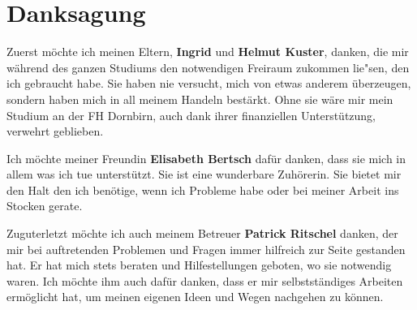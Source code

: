 \chapter*{Danksagung}

Zuerst m\"ochte ich meinen Eltern, {\bf Ingrid} und {\bf Helmut Kuster}, danken, die mir w\"ahrend des ganzen Studiums den notwendigen Freiraum zukommen lie"sen, den ich gebraucht habe. Sie haben nie versucht, mich von etwas anderem \"uberzeugen, sondern haben mich in all meinem Handeln best\"arkt. Ohne sie w\"are mir mein Studium an der FH Dornbirn, auch dank ihrer finanziellen Unterst\"utzung, verwehrt geblieben.

Ich m\"ochte meiner Freundin {\bf Elisabeth Bertsch} daf\"ur danken, dass sie mich in allem was ich tue unterst\"utzt. Sie ist eine wunderbare Zuh\"orerin. Sie bietet mir den Halt den ich ben\"otige, wenn ich Probleme habe oder bei meiner Arbeit ins Stocken gerate.

Zuguterletzt m\"ochte ich auch meinem Betreuer {\bf Patrick Ritschel} danken, der mir bei auftretenden Problemen und Fragen immer hilfreich zur Seite gestanden hat. Er hat mich stets beraten und Hilfestellungen geboten, wo sie notwendig waren. Ich m\"ochte ihm auch daf\"ur danken, dass er mir selbstst\"andiges Arbeiten erm\"oglicht hat, um meinen eigenen Ideen und Wegen nachgehen zu k\"onnen.
